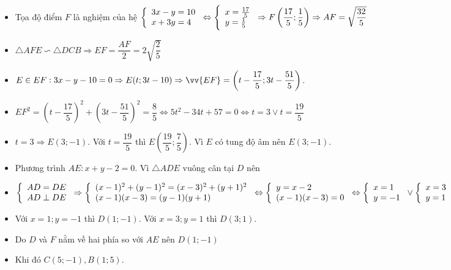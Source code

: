 \begin{itemize}[label=,leftmargin=*]
\item Tọa độ điểm $F$ là nghiệm của hệ $\left\{\begin{array}{ll}3x-y=10 \\ x+3y=4\end{array}\right. \Leftrightarrow \left\{\begin{array}{ll}x=\frac{17}{5} \\ y=\frac{1}{5}\end{array}\right.\Rightarrow F\left(\dfrac{17}{5};\dfrac{1}{5} \right)\Rightarrow AF=\sqrt{\dfrac{32}{5}}$
\item $\triangle AFE\backsim \triangle DCB\Rightarrow EF=\dfrac{AF}{2}=2\sqrt{\dfrac{2}{5}}$
\item $E\in EF:3x-y-10=0\Rightarrow E(t;3t-10)\Rightarrow \vv{EF}=\left(t-\dfrac{17}{5};3t-\dfrac{51}{5} \right)$.
\item $EF^2=\left(t-\dfrac{17}{5} \right)^2+\left(3t-\dfrac{51}{5} \right)^2=\dfrac{8}{5}\Leftrightarrow 5t^2-34t+57=0\Leftrightarrow t=3 \vee t=\dfrac{19}{5}$
\item $t=3\Rightarrow E(3;-1)$. Với $t=\dfrac{19}{5}$ thì $E\left(\dfrac{19}{5};\dfrac{7}{5} \right)$. Vì $E$ có tung độ âm nên $E(3;-1)$.
\item Phương trình $AE:x+y-2=0$. Vì $\triangle ADE$ vuông cân tại $D$ nên
\item $\left\{\begin{array}{ll}AD=DE\\ AD\perp DE\end{array}\right.\Rightarrow \left\{\begin{array}{ll}(x-1)^2+(y-1)^2=(x-3)^2+(y+1)^2 \\ (x-1)(x-3)=(y-1)(y+1)\end{array}\right.\Leftrightarrow \left\{\begin{array}{ll}y=x-2 \\ (x-1)(x-3)=0\end{array}\right.\Leftrightarrow \left\{\begin{array}{ll}x=1 \\ y=-1\end{array}\right.\vee \left\{\begin{array}{ll}x=3 \\ y=1\end{array}\right.$
\item Với $x=1;y=-1$ thì $D(1;-1)$. Với $x=3;y=1$ thì $D(3;1)$.
\item Do $D$ và $F$ nằm về hai phía so với $AE$ nên $D(1;-1)$
\item Khi đó $C(5;-1),B(1;5)$.
\end{itemize}

